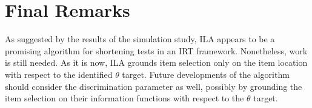 \documentclass[12pt, a4paper, titilepage]{article}
\begin{document}

\section*{Final Remarks}
As suggested by the results of the simulation study, ILA appears to be a promising algorithm for shortening tests in an IRT framework. Nonetheless, work is still needed. As it is now, ILA grounds item selection only on the item location with respect to the identified $\theta$ target. Future developments of the algorithm should consider the discrimination parameter as well, possibly by grounding the item selection on their information functions with respect to the $\theta$ target. 
 

 

\end{document}
